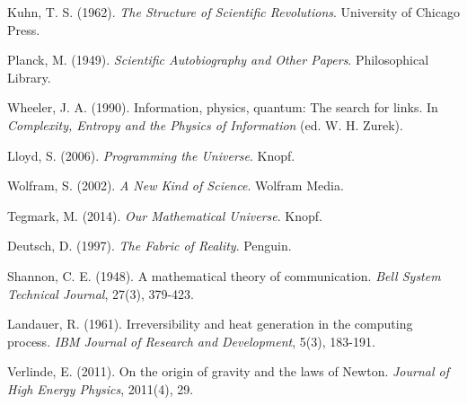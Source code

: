 \documentclass[12pt,preprint]{article}
\begin{document}
\begin{thebibliography}{99}

Kuhn, T. S. (1962). \textit{The Structure of Scientific Revolutions}. University of Chicago Press.

Planck, M. (1949). \textit{Scientific Autobiography and Other Papers}. Philosophical Library.

Wheeler, J. A. (1990). Information, physics, quantum: The search for links. In \textit{Complexity, Entropy and the Physics of Information} (ed. W. H. Zurek).

Lloyd, S. (2006). \textit{Programming the Universe}. Knopf.

Wolfram, S. (2002). \textit{A New Kind of Science}. Wolfram Media.

Tegmark, M. (2014). \textit{Our Mathematical Universe}. Knopf.

Deutsch, D. (1997). \textit{The Fabric of Reality}. Penguin.

Shannon, C. E. (1948). A mathematical theory of communication. \textit{Bell System Technical Journal}, 27(3), 379-423.

Landauer, R. (1961). Irreversibility and heat generation in the computing process. \textit{IBM Journal of Research and Development}, 5(3), 183-191.

Verlinde, E. (2011). On the origin of gravity and the laws of Newton. \textit{Journal of High Energy Physics}, 2011(4), 29.

\end{thebibliography}
\end{document}
